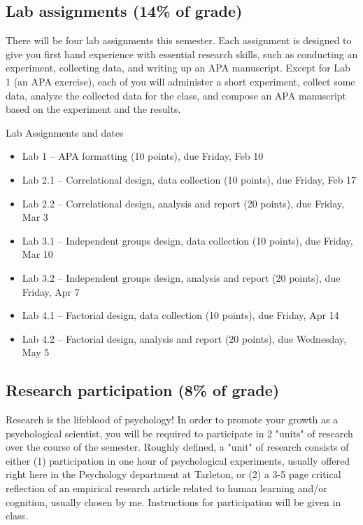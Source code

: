 \documentclass[10pt]{article}
\begin{document}
\subsection*{Lab assignments (14\% of grade)}
\label{sec-5-2}

There will be four lab assignments this semester.  Each assignment is designed to give you first hand experience with essential research skills, such as conducting an experiment, collecting data, and writing up an APA manuscript.  Except for Lab 1 (an APA exercise), each of you will administer a short experiment, collect some data, analyze the collected data for the class, and compose an APA manuscript based on the experiment and the results. 

Lab Assignments and dates

\begin{itemize}
\item Lab 1 – APA formatting (10 points), due Friday, Feb 10
\item Lab 2.1 – Correlational design, data collection (10 points), due Friday, Feb 17
\item Lab 2.2 – Correlational design, analysis and report (20 points), due Friday, Mar 3
\item Lab 3.1 – Independent groups design, data collection (10 points), due Friday, Mar 10
\item Lab 3.2 – Independent groups design, analysis and report (20 points), due Friday, Apr 7
\item Lab 4.1 – Factorial design, data collection (10 points), due Friday, Apr 14
\item Lab 4.2 – Factorial design, analysis and report (20 points), due Wednesday, May 5
\end{itemize}

\subsection*{Research participation (8\% of grade)}
\label{sec-5-3}

Research is the lifeblood of psychology!  In order to promote your growth as a psychological scientist, you will be required to participate in 2 "units" of research over the course of the semester.  Roughly defined, a "unit" of research consists of either (1) participation in one hour of psychological experiments, usually offered right here in the Psychology department at Tarleton, or (2) a 3-5 page critical reflection of an empirical research article related to human learning and/or cognition, usually chosen by me.  Instructions for participation will be given in class.
\end{document}
